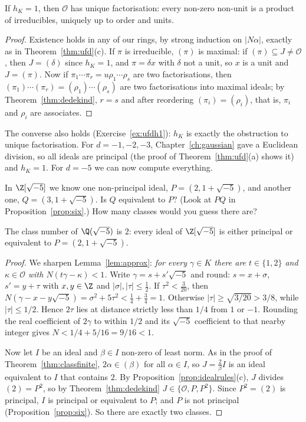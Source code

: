\begin{proposition}\label{prop:h1}
If $h_K=1$, then $\mathcal O$ has unique factorisation: every non-zero non-unit is a product of irreducibles, uniquely up to order and units.
\end{proposition}
\begin{proof}
Existence holds in any of our rings, by strong induction on $|N\alpha|$, exactly as in Theorem~\ref{thm:ufd}(c). If $\pi$ is irreducible, $(\pi)$ is maximal: if $(\pi)\subseteq J\ne\mathcal O$, then $J=(\delta)$ since $h_K=1$, and $\pi=\delta x$ with $\delta$ not a unit, so $x$ is a unit and $J=(\pi)$. Now if $\pi_1\cdots\pi_r=u\rho_1\cdots\rho_s$ are two factorisations, then $(\pi_1)\cdots(\pi_r)=(\rho_1)\cdots(\rho_s)$ are two factorisations into maximal ideals; by Theorem~\ref{thm:dedekind}, $r=s$ and after reordering $(\pi_i)=(\rho_i)$, that is, $\pi_i$ and $\rho_i$ are associates.
\end{proof}

The converse also holds (Exercise~\ref{ex:ufdh1}): $h_K$ is exactly the obstruction to unique factorisation. For $d=-1,-2,-3$, Chapter~\ref{ch:gaussian} gave a Euclidean division, so all ideals are principal (the proof of Theorem~\ref{thm:ufd}(a) shows it) and $h_K=1$. For $d=-5$ we can now compute everything.

\begin{think}
In $\Z[\sqrt{-5}]$ we know one non-principal ideal, $P=(2,1+\sqrt{-5})$, and another one, $Q=(3,1+\sqrt{-5})$. Is $Q$ equivalent to $P$? (Look at $PQ$ in Proposition~\ref{prop:six}.) How many classes would you guess there are?
\end{think}

\begin{theorem}\label{thm:hm5}
The class number of $\Q(\sqrt{-5})$ is $2$: every ideal of $\Z[\sqrt{-5}]$ is either principal or equivalent to $P=(2,1+\sqrt{-5})$.
\end{theorem}
\begin{proof}
We sharpen Lemma~\ref{lem:approx}: \emph{for every $\gamma\in K$ there are $t\in\{1,2\}$ and $\kappa\in\mathcal O$ with $N(t\gamma-\kappa)<1$.} Write $\gamma=s+s'\sqrt{-5}$ and round: $s=x+\sigma$, $s'=y+\tau$ with $x,y\in\Z$ and $|\sigma|,|\tau|\le\frac12$. If $\tau^2<\frac3{20}$, then $N(\gamma-x-y\sqrt{-5})=\sigma^2+5\tau^2<\frac14+\frac34=1$. Otherwise $|\tau|\ge\sqrt{3/20}>3/8$, while $|\tau|\le1/2$. Hence $2\tau$ lies at distance strictly less than $1/4$ from $1$ or $-1$. Rounding the real coefficient of $2\gamma$ to within $1/2$ and its $\sqrt{-5}$ coefficient to that nearby integer gives $N<1/4+5/16=9/16<1$.

Now let $I$ be an ideal and $\beta\in I$ non-zero of least norm. As in the proof of Theorem~\ref{thm:classfinite}, $2\alpha\in(\beta)$ for all $\alpha\in I$, so $J=\frac2\beta I$ is an ideal equivalent to $I$ that contains $2$. By Proposition~\ref{prop:idealrules}(c), $J$ divides $(2)=P^2$, so by Theorem~\ref{thm:dedekind} $J\in\{\mathcal O,P,P^2\}$. Since $P^2=(2)$ is principal, $I$ is principal or equivalent to $P$; and $P$ is not principal (Proposition~\ref{prop:six}). So there are exactly two classes.
\end{proof}

